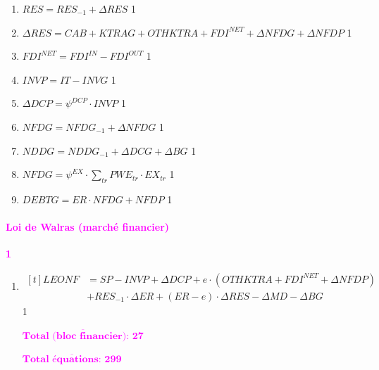 \documentclass[11pt,a4paper]{article}
\newcommand{\tr}{\mathit{tr}}
\newcommand{\BG}{\mathit{BG}}
\newcommand{\CAB}{\mathit{CAB}}
\newcommand{\DCG}{\mathit{DCG}}
\newcommand{\DCP}{\mathit{DCP}}
\newcommand{\DEBTG}{\mathit{DEBTG}}
\newcommand{\ER}{\mathit{ER}}
\newcommand{\EX}{\mathit{EX}}
\newcommand{\FDI}{\mathit{FDI}}
\newcommand{\INVG}{\mathit{INVG}}
\newcommand{\INVP}{\mathit{INVP}}
\newcommand{\IT}{\mathit{IT}}
\newcommand{\KTRAG}{\mathit{KTRAG}}
\newcommand{\LEONF}{\mathit{LEONF}}
\newcommand{\MD}{\mathit{MD}}
\newcommand{\NDDG}{\mathit{NDDG}}
\newcommand{\NFDG}{\mathit{NFDG}}
\newcommand{\NFDP}{\mathit{NFDP}}
\newcommand{\OTHKTRA}{\mathit{OTHKTRA}}
\newcommand{\PWE}{\mathit{PWE}}
\newcommand{\RES}{\mathit{RES}}
\newcommand{\SP}{\mathit{SP}}
\newcommand{\redparagraph}[1]{\paragraph*{\large\textcolor{Fuchsia}{#1}}}
\begin{document}
\begin{enumerate}[itemsep=2pt,label=\textbf{eqfin\arabic*}.,  ref=\textbf{eqfin\arabic*}]
		\item $\RES  = \RES_{-1} + \Delta \RES$ \hfill 1	
		
		\item $\Delta \RES = \CAB + \KTRAG + \OTHKTRA + \FDI^{\textit{NET}} + \Delta \NFDG + \Delta \NFDP $ \hfill 1	
		
		\item $\FDI^{\textit{NET}} = \FDI^{\textit{IN}} - \FDI^{\textit{OUT}} $ \hfill 1							
		
		\item $\INVP  = \IT - \INVG$ \hfill 1		
		
		\item $\Delta\DCP = \psi^{\DCP} \cdot \INVP$ \hfill 1	
		
		\item $\NFDG  = \NFDG_{-1} + \Delta \NFDG$ \hfill 1		
		
		\item $\NDDG  = \NDDG_{-1} + \Delta \DCG+ \Delta \BG$ \hfill 1							
		
		\item $\NFDG  = \psi^{\EX} \cdot \sum_{\tr}\PWE_{\tr}\cdot\EX_{\tr}$ \hfill 1		
		
		\item $\DEBTG = \ER\cdot\NFDG + \NFDP$ \hfill 1	
				
	\end{enumerate}
	
	\redparagraph{Loi de Walras (marché financier)}\hfill \textcolor{Fuchsia}{\textbf{1}} 
	\begin{enumerate}[itemsep=2pt,label=\textbf{eqfin\arabic*}.,resume,  ref=\textbf{eqfin\arabic*}]
		
		\item 	$ \begin{aligned}[t]
			\LEONF & = \SP - \INVP + \Delta\DCP + e \cdot \left(\OTHKTRA + \FDI^{\textit{NET}} + \Delta\NFDP\right)\\
			& + \RES_{-1} \cdot \Delta \ER + (\ER - e) \cdot \Delta\RES - \Delta\MD - \Delta\BG
		\end{aligned}$   \hfill 1
		
		\hfill \textcolor{Fuchsia}{$\overline{\textbf{Total (bloc financier): 27}}$}
		
		\hfill \textcolor{Fuchsia}{$\overline{\textbf{Total équations: 299}}$}
	\end{enumerate}
	
\end{document}
